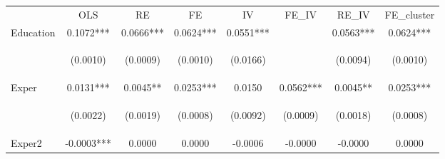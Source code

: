 \begin{center}
\begin{tabular}{lccccccc}
\hline \noalign{\smallskip} & OLS & RE & FE & IV & FE_IV & RE_IV & FE_cluster\\
\noalign{\smallskip}\hline \noalign{\smallskip}Education & 0.1072*** & 0.0666*** & 0.0624*** & 0.0551*** &  & 0.0563*** & 0.0624***\\
 & \begin{footnotesize}(0.0010)\end{footnotesize} & \begin{footnotesize}(0.0009)\end{footnotesize} & \begin{footnotesize}(0.0010)\end{footnotesize} & \begin{footnotesize}(0.0166)\end{footnotesize} & \begin{footnotesize}\end{footnotesize} & \begin{footnotesize}(0.0094)\end{footnotesize} & \begin{footnotesize}(0.0010)\end{footnotesize}\\
\noalign{\smallskip}Exper & 0.0131*** & 0.0045** & 0.0253*** & 0.0150 & 0.0562*** & 0.0045** & 0.0253***\\
 & \begin{footnotesize}(0.0022)\end{footnotesize} & \begin{footnotesize}(0.0019)\end{footnotesize} & \begin{footnotesize}(0.0008)\end{footnotesize} & \begin{footnotesize}(0.0092)\end{footnotesize} & \begin{footnotesize}(0.0009)\end{footnotesize} & \begin{footnotesize}(0.0018)\end{footnotesize} & \begin{footnotesize}(0.0008)\end{footnotesize}\\
\noalign{\smallskip}Exper2 & -0.0003*** & 0.0000 & 0.0000 & -0.0006 & -0.0000 & -0.0000 & 0.0000\\

\end{tabular}
\end{center}
